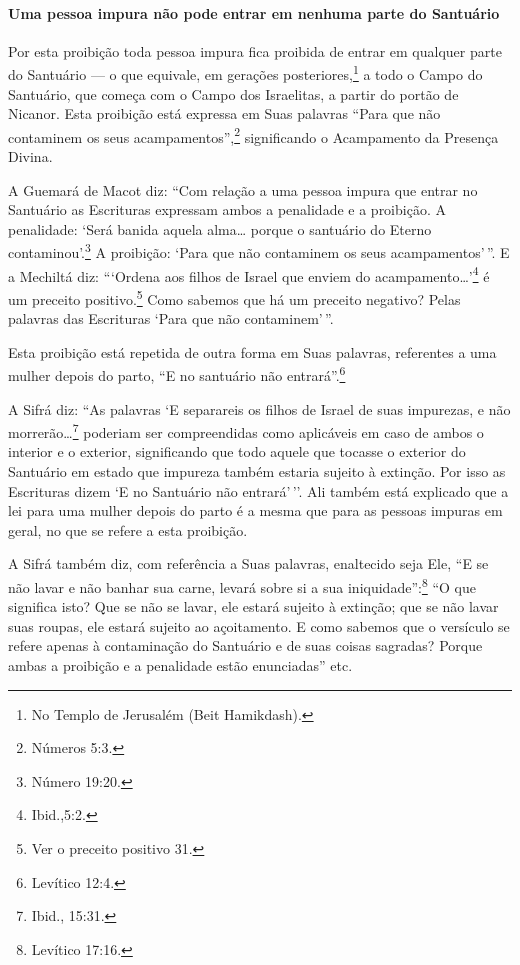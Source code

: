 \begin{multicols}{2}
\paragraph{Uma pessoa impura não pode entrar em nenhuma parte do Santuário}

Por esta proibição toda pessoa impura fica proibida de entrar em
qualquer parte do Santuário --- o que equivale, em gerações
posteriores,\footnote{No Templo de Jerusalém (Beit Hamikdash).} a todo o Campo do Santuário, que
começa com o Campo dos Israelitas, a partir do portão de Nicanor\starr. Esta
proibição está expressa em Suas palavras ``Para que não contaminem os
seus acampamentos'',\footnote{Números 5:3.} significando o Acampamento da
Presença Divina.

A Guemará\starr{} de Macot\starr{} diz: ``Com relação a uma pessoa impura que entrar no
Santuário as Escrituras expressam ambos a penalidade e a proibição. A
penalidade: `Será banida aquela alma\ldots{} porque o santuário do Eterno
contaminou'.\footnote{Número 19:20.} A proibição: `Para que não contaminem os
seus acampamentos'\,''. E a Mechiltá\starr{} diz: ```Ordena aos filhos de Israel
que enviem do acampamento\ldots{}'\footnote{Ibid.,5:2.} é um preceito
positivo.\footnote{Ver o preceito positivo 31.} Como sabemos que há um preceito
negativo? Pelas palavras das Escrituras `Para que não contaminem'\,''.

Esta proibição está repetida de outra forma em Suas palavras, referentes
a uma mulher depois do parto, ``E no santuário não entrará''.\footnote{Levítico
12:4.}

A Sifrá\starr{} diz: ``As palavras `E separareis os filhos de Israel de suas
impurezas, e não morrerão\ldots{}\footnote{Ibid., 15:31.} poderiam ser compreendidas
como aplicáveis em caso de ambos o interior e o exterior, significando
que todo aquele que tocasse o exterior do Santuário em estado que
impureza também estaria sujeito à extinção. Por isso as Escrituras dizem
`E no Santuário não entrará'\,''. Ali também está explicado que a lei para
uma mulher depois do parto é a mesma que para as pessoas impuras em
geral, no que se refere a esta proibição.

A Sifrá\starr{} também diz, com referência a Suas palavras, enaltecido seja Ele,
``E se não lavar e não banhar sua carne, levará sobre si a sua
iniquidade'':\footnote{Levítico 17:16.} ``O que significa isto? Que se não se
lavar, ele estará sujeito à extinção; que se não lavar suas roupas, ele
estará sujeito ao açoitamento. E como sabemos que o versículo se refere
apenas à contaminação do Santuário e de suas coisas sagradas? Porque
ambas a proibição e a penalidade estão enunciadas'' etc.


\end{multicols}
